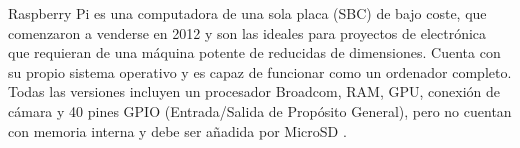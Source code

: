 \begin{figure}[H]
	{\def\svgwidth{.21\textwidth}
		}
\end{figure}

Raspberry Pi es una computadora de una sola placa (SBC) de bajo coste, que comenzaron a venderse en 2012 y son las ideales para proyectos de electrónica que requieran de una máquina potente de reducidas de dimensiones. Cuenta con su propio sistema operativo y es capaz de funcionar como un ordenador completo. Todas las versiones incluyen un procesador Broadcom, RAM, GPU, conexión de cámara y 40 pines GPIO (Entrada/Salida de Propósito General), pero no cuentan con memoria interna y debe ser añadida por MicroSD \cite{noauthor_raspberry_2021}.

